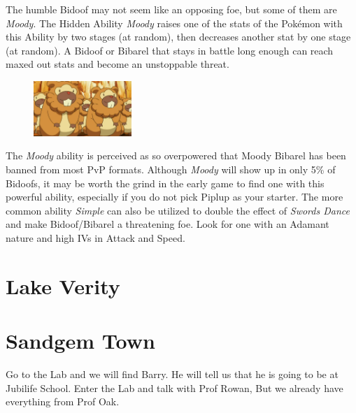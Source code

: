 \documentclass[11pt]{article}
\begin{document}
\begin{mdframed}[style=MyFrame,nobreak=true,frametitle={Pokemon Spotlight: Bidoof}]

The humble Bidoof may not seem like an opposing foe, but some of them are \emph{Moody}.
The Hidden Ability \emph{Moody} raises one of the stats of the Pokémon with this
Ability by two stages (at random), then decreases another stat by one stage (at random).
A Bidoof or Bibarel that stays in battle long enough can reach maxed out stats
and become an unstoppable threat.

\begin{figure}
\includegraphics[width=0.33\textwidth]{walkthrough/Sinnoh/spotlight-bidoof}
\label{fig:spotlight-bidoof}
\end{figure}

The \emph{Moody} ability is perceived as so overpowered that Moody Bibarel has been
banned from most PvP formats.
Although \emph{Moody} will show up in only 5\% of Bidoofs, it may be worth the
grind in the early game to find one with this powerful ability, especially if
you do not pick Piplup as your starter.
The more common ability \emph{Simple} can also be utilized to double the effect of
\emph{Swords Dance} and make Bidoof/Bibarel a threatening foe.
Look for one with an Adamant nature and high IVs in Attack and Speed.

\end{mdframed}

\section{Lake Verity}\label{sec:Lake_Verity}




\section{Sandgem Town}\label{sec:sandgem-town}
Go to the Lab and we will find Barry. He will tell us that he is going to be at Jubilife School.
Enter the Lab and talk with Prof Rowan, But we already have everything from Prof Oak.
\end{document}
